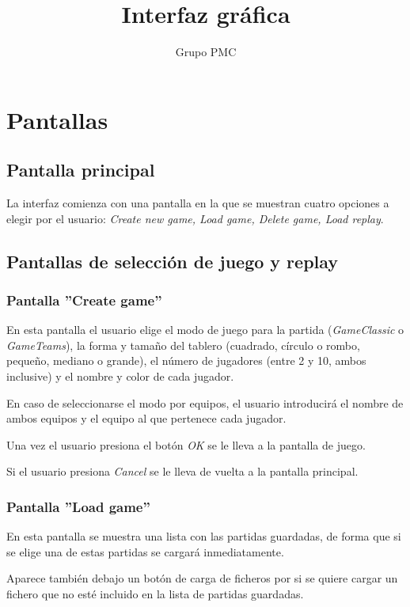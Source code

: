 \documentclass[14pt]{extreport}
\author{Grupo PMC}
\begin{document}
\title{Interfaz gráfica}
\maketitle


\section*{Pantallas}

\subsection*{Pantalla principal}
La interfaz comienza con una pantalla en la que se muestran cuatro opciones a elegir por el usuario: \textit{Create new game, Load game, Delete game, Load replay}.

\subsection*{Pantallas de selección de juego y replay}

\subsubsection*{Pantalla ''Create game''}
En esta pantalla el usuario elige el modo de juego para la partida (\textit{GameClassic} o \textit{GameTeams}), la forma y tamaño del tablero (cuadrado, círculo o rombo, pequeño, mediano o grande), el número de jugadores (entre 2 y 10, ambos inclusive) y el nombre y color de cada jugador.

En caso de seleccionarse el modo por equipos, el usuario introducirá el nombre de ambos equipos y el equipo al que pertenece cada jugador.

Una vez el usuario presiona el botón \textit{OK} se le lleva a la pantalla de juego.

Si el usuario presiona \textit{Cancel} se le lleva de vuelta a la pantalla principal.

\subsubsection*{Pantalla ''Load game''}
En esta pantalla se muestra una lista con las partidas guardadas, de forma que si se elige una de estas partidas se cargará inmediatamente.

Aparece también debajo un botón de carga de ficheros por si se quiere cargar un fichero que no esté incluido en la lista de partidas guardadas.
\end{document}
